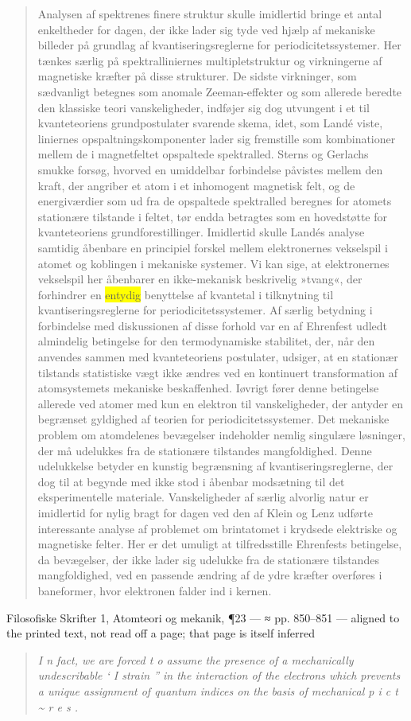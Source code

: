 \documentclass[11pt]{article}
\newcommand{\dcite}[1]{{\nopagebreak\raggedleft\small #1\par}\medskip}
\newcommand{\tlg}[1]{{\setlength{\fboxsep}{0.8pt}\colorbox{yellow}{#1}}}
\newcommand{\olg}[1]{{\setlength{\fboxsep}{0.8pt}\colorbox{cyan!25}{#1}}}
\begin{document}
\begin{quote}
Analysen af spektrenes finere struktur skulle imidlertid bringe et antal enkeltheder for dagen, der ikke lader sig tyde ved hjælp af mekaniske billeder på grundlag af kvantiseringsreglerne for periodicitetssystemer. Her tænkes særlig på spektralliniernes multipletstruktur og virkningerne af magnetiske kræfter på disse strukturer. De sidste virkninger, som sædvanligt betegnes som anomale Zeeman-effekter og som allerede beredte den klassiske teori vanskeligheder, indføjer sig dog utvungent i et til kvanteteoriens grundpostulater svarende skema, idet, som Landé viste, liniernes opspaltningskomponenter lader sig fremstille som kombinationer mellem de i magnetfeltet opspaltede spektralled. Sterns og Gerlachs smukke forsøg, hvorved en umiddelbar forbindelse påvistes mellem den kraft, der angriber et atom i et inhomogent magnetisk felt, og de energiværdier som ud fra de opspaltede spektralled beregnes for atomets stationære tilstande i feltet, tør endda betragtes som en hovedstøtte for kvanteteoriens grundforestillinger. Imidlertid skulle Landés analyse samtidig åbenbare en principiel forskel mellem elektronernes vekselspil i atomet og koblingen i mekaniske systemer. Vi kan sige, at elektronernes vekselspil her åbenbarer en ikke-mekanisk beskrivelig »tvang«, der forhindrer en \tlg{entydig} benyttelse af kvantetal i tilknytning til kvantiseringsreglerne for periodicitetssystemer. Af særlig betydning i forbindelse med diskussionen af disse forhold var en af Ehrenfest udledt almindelig betingelse for den termodynamiske stabilitet, der, når den anvendes sammen med kvanteteoriens postulater, udsiger, at en stationær tilstands statistiske vægt ikke ændres ved en kontinuert transformation af atomsystemets mekaniske beskaffenhed. Iøvrigt fører denne betingelse allerede ved atomer med kun en elektron til vanskeligheder, der antyder en begrænset gyldighed af teorien for periodicitetssystemer. Det mekaniske problem om atomdelenes bevægelser indeholder nemlig singulære løsninger, der må udelukkes fra de stationære tilstandes mangfoldighed. Denne udelukkelse betyder en kunstig begrænsning af kvantiseringsreglerne, der dog til at begynde med ikke stod i åbenbar modsætning til det eksperimentelle materiale. Vanskeligheder af særlig alvorlig natur er imidlertid for nylig bragt for dagen ved den af Klein og Lenz udførte interessante analyse af problemet om brintatomet i krydsede elektriske og magnetiske felter. Her er det umuligt at tilfredsstille Ehrenfests betingelse, da bevægelser, der ikke lader sig udelukke fra de stationære tilstandes mangfoldighed, ved en passende ændring af de ydre kræfter overføres i baneformer, hvor elektronen falder ind i kernen.
\end{quote}
\dcite{Filosofiske Skrifter 1, Atomteori og mekanik, ¶23 — ≈ pp. 850–851 — aligned to the printed text, not read off a page; that page is itself inferred}
{\footnotesize\begin{quote}\itshape
I n fact, we are forced t o assume the presence of a mechanically undescribable ‘ I strain ” in the interaction of the electrons which prevents a \olg{unique} assignment of quantum indices on the basis of mechanical p i c t \textasciitilde{} r e s .
\end{quote}}
\end{document}
